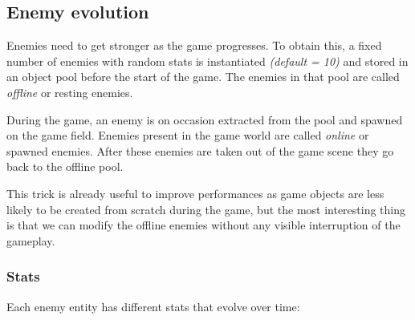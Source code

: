 \documentclass[11pt]{article}
\begin{document}
\FloatBarrier

\subsection{Enemy evolution}
Enemies need to get stronger as the game progresses. To obtain this, a fixed number of enemies with random stats is instantiated \textit{(default = 10)} and stored in an object pool before the start of the game. The enemies in that pool are called \textit{offline} or resting enemies.

During the game, an enemy is on occasion extracted from the pool and spawned on the game field. Enemies present in the game world are called \textit{online} or spawned enemies. After these enemies are taken out of the game scene they go back to the offline pool.

This trick is already useful to improve performances as game objects are less likely to be created from scratch during the game, but the most interesting thing is that we can modify the offline enemies without any visible interruption of the gameplay.

\subsubsection{Stats}
Each enemy entity has different stats that evolve over time:
\end{document}
